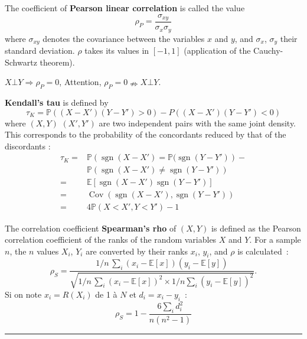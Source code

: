 \begin{f}

The coefficient of \textbf{Pearson linear correlation} is called the value
$$
\rho_P = \frac{\sigma_{xy}}{\sigma_x \sigma_y}
$$
where $\sigma_{xy}$ denotes the covariance between the variables $x$ and $y$, and $\sigma_x$, $\sigma_y$ their standard deviation.
$\rho$ takes its values in $[-1,1]$ (application of the Cauchy-Schwartz theorem).

$X\bot Y \Rightarrow \rho_P=0$, Attention, $\rho_P=0 \nRightarrow X\bot Y $. 


 

\textbf{Kendall's tau} is defined by
$$
\tau_K=\mathbb{P}((X-X')(Y-Y')>0)-P((X-X')(Y-Y')<0)
$$
where $(X,Y)$  $(X',Y')$ are two independent pairs with the same joint density. This corresponds to the probability of the concordants reduced by that of the discordants :
\begin{align*}
\tau_K	=&\mathbb{P}\left(\operatorname{sgn}(X-X')=\mathbb{P}(\operatorname{sgn}(Y-Y')\right)-\\
		&\mathbb{P}\left(\operatorname{sgn}(X-X')\neq \operatorname{sgn}(Y-Y')\right)\\
=&\mathbb{E}\left[ \operatorname{sgn}(X-X')\operatorname{sgn}(Y-Y')\right]\\
=&\operatorname{Cov}(\operatorname{sgn}(X-X'),\operatorname{sgn}(Y-Y'))\\
=&4\mathbb{P}(X<X',Y<Y')-1 
\end{align*}

The correlation coefficient \textbf{Spearman's rho} of $(X,Y)$ is defined as the Pearson correlation coefficient of the ranks of the random variables $X$ and $Y$.
For a sample $n$, the $n$ values $X_i$, $Y_i$ are converted by their ranks $x_i$, $y_i$, and $\rho$ is calculated~:
$$
\rho_S = \frac{1/n\,\sum_i(x_i-\mathbb{E}[x])(y_i-\mathbb{E}[y])}{\sqrt{1/n\,\sum_i (x_i-\mathbb{E}[x])^2 \times 1/n\sum_i(y_i-\mathbb{E}[y])^2}}.
$$
Si on note $x_i= R(X_i)$ de 1 à $N$ et  $d_i = x_i - y_i$~:
$$    \rho_S = 1- {\frac {6 \sum_i d_i^2}{n(n^2 - 1)}}$$

\end{f}
\hrule

